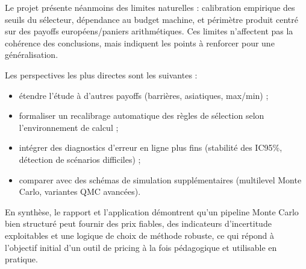 ﻿\documentclass[11pt,a4paper]{article}
\begin{document}
Le projet présente néanmoins des limites naturelles : calibration empirique des seuils du sélecteur, dépendance au budget machine, et périmètre produit centré sur des payoffs européens/paniers arithmétiques. Ces limites n'affectent pas la cohérence des conclusions, mais indiquent les points à renforcer pour une généralisation.

Les perspectives les plus directes sont les suivantes :
\begin{itemize}
    \item étendre l'étude à d'autres payoffs (barrières, asiatiques, max/min) ;
    \item formaliser un recalibrage automatique des règles de sélection selon l'environnement de calcul ;
    \item intégrer des diagnostics d'erreur en ligne plus fins (stabilité des IC95\%, détection de scénarios difficiles) ;
    \item comparer avec des schémas de simulation supplémentaires (multilevel Monte Carlo, variantes QMC avancées).
\end{itemize}

En synthèse, le rapport et l'application démontrent qu'un pipeline Monte Carlo bien structuré peut fournir des prix fiables, des indicateurs d'incertitude exploitables et une logique de choix de méthode robuste, ce qui répond à l'objectif initial d'un outil de pricing à la fois pédagogique et utilisable en pratique.
\end{document}
